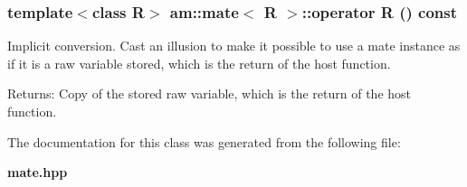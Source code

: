 \subsubsection{\setlength{\rightskip}{0pt plus 5cm}template$<$class R$>$ {\bf am::mate}$<$ R $>$::operator R () const\hspace{0.3cm}{\tt  [inline]}}\label{classam_1_1mate_5bd50a39a4ed2ee277652d394de0acab}


Implicit conversion. Cast an illusion to make it possible to use a mate instance as if it is a raw variable stored, which is the return of the host function.

\begin{Desc}
\item[Returns:]Copy of the stored raw variable, which is the return of the host function. \end{Desc}


The documentation for this class was generated from the following file:\begin{CompactItemize}
\item 
{\bf mate.hpp}\end{CompactItemize}
